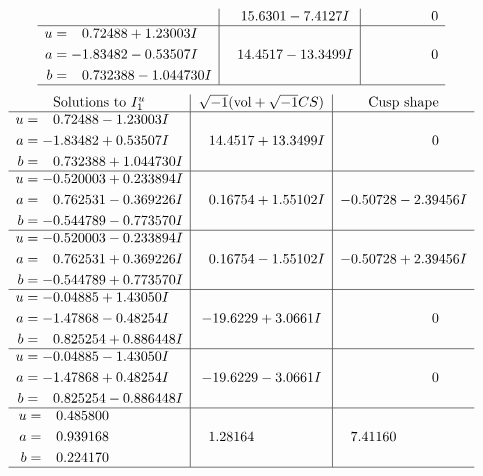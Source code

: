 \documentclass[1p]{elsarticle_modified}
\theoremstyle{definition}
\newcommand{\I}{\sqrt{-1}}
\begin{document}
$$\begin{array}{c|c|c}
 & \phantom{-}15.6301 - 7.4127 I & \phantom{-0.000000 } 0 \\ \hline\begin{aligned}
u &= \phantom{-}0.72488 + 1.23003 I \\
a &= -1.83482 - 0.53507 I \\
b &= \phantom{-}0.732388 - 1.044730 I\end{aligned}
 & \phantom{-}14.4517 - 13.3499 I & \phantom{-0.000000 } 0\\
 \hline 
 \end{array}$$\newpage$$\begin{array}{c|c|c}  
\text{Solutions to }I^u_{1}& \I (\text{vol} + \sqrt{-1}CS) & \text{Cusp shape}\\
 \hline 
\begin{aligned}
u &= \phantom{-}0.72488 - 1.23003 I \\
a &= -1.83482 + 0.53507 I \\
b &= \phantom{-}0.732388 + 1.044730 I\end{aligned}
 & \phantom{-}14.4517 + 13.3499 I & \phantom{-0.000000 } 0 \\ \hline\begin{aligned}
u &= -0.520003 + 0.233894 I \\
a &= \phantom{-}0.762531 - 0.369226 I \\
b &= -0.544789 - 0.773570 I\end{aligned}
 & \phantom{-}0.16754 + 1.55102 I & -0.50728 - 2.39456 I \\ \hline\begin{aligned}
u &= -0.520003 - 0.233894 I \\
a &= \phantom{-}0.762531 + 0.369226 I \\
b &= -0.544789 + 0.773570 I\end{aligned}
 & \phantom{-}0.16754 - 1.55102 I & -0.50728 + 2.39456 I \\ \hline\begin{aligned}
u &= -0.04885 + 1.43050 I \\
a &= -1.47868 - 0.48254 I \\
b &= \phantom{-}0.825254 + 0.886448 I\end{aligned}
 & -19.6229 + 3.0661 I & \phantom{-0.000000 } 0 \\ \hline\begin{aligned}
u &= -0.04885 - 1.43050 I \\
a &= -1.47868 + 0.48254 I \\
b &= \phantom{-}0.825254 - 0.886448 I\end{aligned}
 & -19.6229 - 3.0661 I & \phantom{-0.000000 } 0 \\ \hline\begin{aligned}
u &= \phantom{-}0.485800\phantom{ +0.000000I} \\
a &= \phantom{-}0.939168\phantom{ +0.000000I} \\
b &= \phantom{-}0.224170\phantom{ +0.000000I}\end{aligned}
 & \phantom{-}1.28164\phantom{ +0.000000I} & \phantom{-}7.41160\phantom{ +0.000000I}\\
 \hline 
 \end{array}$$\newpage\newpage\renewcommand{\arraystretch}{1}
\end{document}
